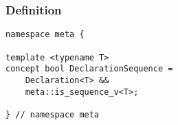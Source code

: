 
\subsubsection{Definition}

\begin{verbatim}
namespace meta {

template <typename T>
concept bool DeclarationSequence =
	Declaration<T> &&
	meta::is_sequence_v<T>;

} // namespace meta
\end{verbatim}
